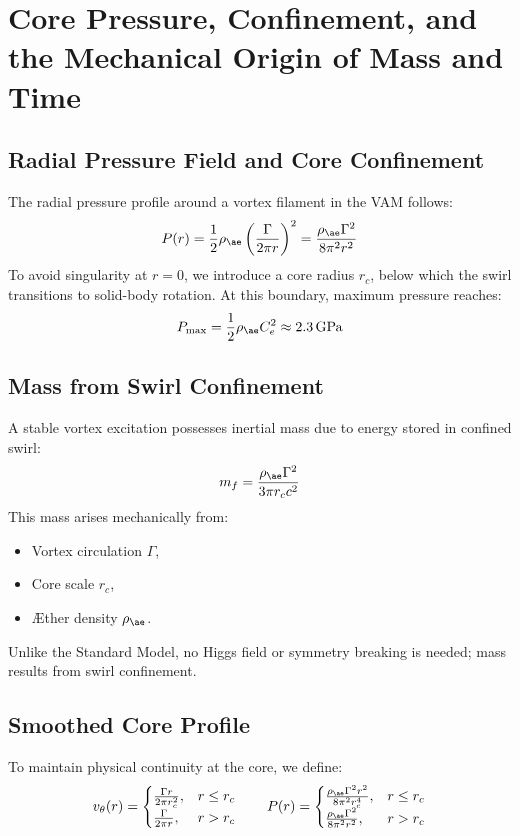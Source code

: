 \section{Core Pressure, Confinement, and the Mechanical Origin of Mass and Time}

\subsection{Radial Pressure Field and Core Confinement}

The radial pressure profile around a vortex filament in the VAM follows:
\begin{equation}
    P(r) = \frac{1}{2} \rho_{\ae} \left( \frac{\Gamma}{2\pi r} \right)^2 = \frac{\rho_{\ae} \Gamma^2}{8\pi^2 r^2}
\end{equation}
To avoid singularity at \( r = 0 \), we introduce a core radius \( r_c \), below which the swirl transitions to solid-body rotation. At this boundary, maximum pressure reaches:
\begin{equation}
    P_{\text{max}} = \frac{1}{2} \rho_{\ae} C_e^2 \approx 2.3 \, \text{GPa}
\end{equation}

\subsection{Mass from Swirl Confinement}\label{subsec:mass-from-swirl}

A stable vortex excitation possesses inertial mass due to energy stored in confined swirl:
\begin{equation}
    m_f = \frac{\rho_{\ae} \Gamma^2}{3\pi r_c c^2}
\end{equation}
This mass arises mechanically from:
\begin{itemize}
    \item Vortex circulation \( \Gamma \),
    \item Core scale \( r_c \),
    \item Æther density \( \rho_{\ae} \).
\end{itemize}
Unlike the Standard Model, no Higgs field or symmetry breaking is needed; mass results from swirl confinement.

\subsection{Smoothed Core Profile}

To maintain physical continuity at the core, we define:
\begin{equation}
    v_\theta(r) =
    \begin{cases}
        \frac{\Gamma r}{2\pi r_c^2}, & r \leq r_c \\
        \frac{\Gamma}{2\pi r}, & r > r_c
    \end{cases}
    \qquad
    P(r) =
    \begin{cases}
        \frac{\rho_{\ae} \Gamma^2 r^2}{8\pi^2 r_c^4}, & r \leq r_c \\
        \frac{\rho_{\ae} \Gamma^2}{8\pi^2 r^2}, & r > r_c
    \end{cases}
\end{equation}

